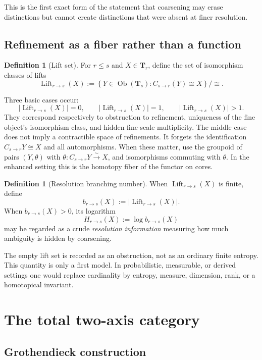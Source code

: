 \documentclass[11pt]{article}
\theoremstyle{definition}
\newtheorem{definition}[theorem]{Definition}
\theoremstyle{remark}
\newcommand{\Tcat}{\mathbf T}
\newcommand{\Ob}{\operatorname{Ob}}
\newcommand{\Lift}{\operatorname{Lift}}
\begin{document}
This is the first exact form of the statement that coarsening may erase distinctions but cannot create distinctions that were absent at finer resolution.

\subsection{Refinement as a fiber rather than a function}

\begin{definition}[Lift set]
For $r\le s$ and $X\in\Tcat_r$, define the set of isomorphism classes of lifts
\[
\Lift_{r\to s}(X)
:=
\left\{
Y\in\Ob(\Tcat_s):C_{s\to r}(Y)\cong X
\right\}/\cong.
\]
\end{definition}

Three basic cases occur:
\[
|\Lift_{r\to s}(X)|=0,
\qquad
|\Lift_{r\to s}(X)|=1,
\qquad
|\Lift_{r\to s}(X)|>1.
\]
They correspond respectively to obstruction to refinement, uniqueness of the fine object's isomorphism class, and hidden fine-scale multiplicity. The middle case does not imply a contractible space of refinements. It forgets the identification $C_{s\to r}Y\cong X$ and all automorphisms. When these matter, use the groupoid of pairs $(Y,\theta)$ with $\theta:C_{s\to r}Y\xrightarrow{\sim}X$, and isomorphisms commuting with $\theta$. In the enhanced setting this is the homotopy fiber of the functor on cores.

\begin{definition}[Resolution branching number]
When $\Lift_{r\to s}(X)$ is finite, define
\[
b_{r\to s}(X):=|\Lift_{r\to s}(X)|.
\]
When $b_{r\to s}(X)>0$, its logarithm
\[
H_{r\to s}(X):=\log b_{r\to s}(X)
\]
may be regarded as a crude \emph{resolution information} measuring how much ambiguity is hidden by coarsening.
\end{definition}

The empty lift set is recorded as an obstruction, not as an ordinary finite entropy. This quantity is only a first model. In probabilistic, measurable, or derived settings one would replace cardinality by entropy, measure, dimension, rank, or a homotopical invariant.

\section{The total two-axis category}

\subsection{Grothendieck construction}
\end{document}
